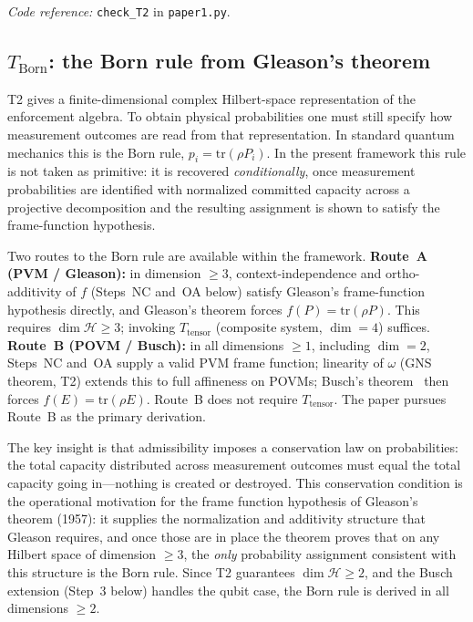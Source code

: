 \documentclass[11pt]{article}
\theoremstyle{remark}
\newcommand{\coderef}[2]{\smallskip\noindent\textit{Code reference:} \texttt{#1} in \texttt{#2}.}
\begin{document}
\coderef{check\_T2}{paper1.py}



\subsection{\texorpdfstring{$T_{\mathrm{Born}}$}{T Born}: the Born rule from Gleason's theorem}

T2 gives a finite-dimensional complex Hilbert-space representation of the
enforcement algebra.  To obtain physical probabilities one must still specify
how measurement outcomes are read from that representation.  In standard
quantum mechanics this is the Born rule, $p_i = \mathrm{tr}(\rho P_i)$.  In
the present framework this rule is not taken as primitive: it is recovered
\emph{conditionally}, once measurement probabilities are identified with
normalized committed capacity across a projective decomposition and the
resulting assignment is shown to satisfy the frame-function hypothesis.

Two routes to the Born rule are available within the framework.  \textbf{Route~A (PVM / Gleason):} in dimension $\ge 3$, context-independence and ortho-additivity of $f$ (Steps~NC and~OA below) satisfy Gleason's frame-function hypothesis directly, and Gleason's theorem forces $f(P) = \mathrm{tr}(\rho P)$.  This requires $\dim \mathcal{H} \ge 3$; invoking $T_{\mathrm{tensor}}$ (composite system, $\dim = 4$) suffices.  \textbf{Route~B (POVM / Busch):} in all dimensions $\ge 1$, including $\dim = 2$, Steps~NC and~OA supply a valid PVM frame function; linearity of $\omega$ (GNS theorem, T2) extends this to full affineness on POVMs; Busch's theorem~\cite{Busch2003} then forces $f(E) = \mathrm{tr}(\rho E)$.  Route~B does not require $T_{\mathrm{tensor}}$.  The paper pursues Route~B as the primary derivation.

The key insight is that admissibility imposes a conservation law on probabilities: the total capacity distributed across measurement outcomes must equal the total capacity going in---nothing is created or destroyed.  This conservation condition is the operational motivation for the frame function hypothesis of Gleason's theorem (1957): it supplies the normalization and additivity structure that Gleason requires, and once those are in place the theorem proves that on any Hilbert space of dimension $\ge 3$, the \emph{only} probability assignment consistent with this structure is the Born rule.  Since T2 guarantees $\dim \mathcal{H} \ge 2$, and the Busch extension (Step~3 below) handles the qubit case, the Born rule is derived in all dimensions $\ge 2$.
\end{document}
